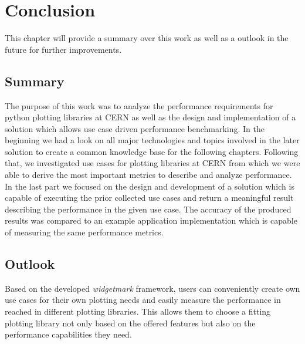 

\chapter{Conclusion}
\label{ch:conclusion}

This chapter will provide a summary over this work as well as a outlook in the
future for further improvements.

\section{Summary}
\label{sec:Conclusion:Summary}

The purpose of this work was to analyze the performance requirements for python
plotting libraries at CERN as well as the design and implementation of a
solution which allows use case driven performance benchmarking.  In the
beginning we had a look on all major technologies and topics involved in the
later solution to create a common knowledge base for the following chapters.
Following that, we investigated use cases for plotting libraries at CERN from
which we were able to derive the most important metrics to describe and analyze
performance. In the last part we focused on the design and development of a
solution which is capable of executing the prior collected use cases and return
a meaningful result describing the performance in the given use case. The
accuracy of the produced results was compared to an example application
implementation which is capable of measuring the same performance metrics.

\section{Outlook}
\label{sec:Conclusion:Outlook}

Based on the developed \emph{widgetmark} framework, users can conveniently
create own use cases for their own plotting needs and easily measure the
performance in reached in different plotting libraries. This allows them to
choose a fitting plotting library not only based on the offered features but
also on the performance capabilities they need.

